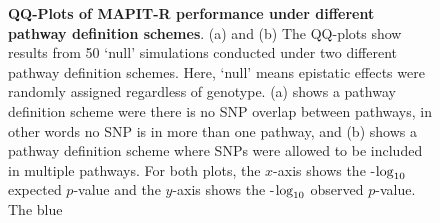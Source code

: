 \documentclass[10pt]{article}
\def\log{{\rm log}}
\begin{document}
\begin{figure}[htbp]
\centering
{}
\caption{\textbf{QQ-Plots of MAPIT-R performance under different pathway definition schemes}. (a) and (b) The QQ-plots show results from 50 `null' simulations conducted under two different pathway definition schemes. Here, `null' means epistatic effects were randomly assigned regardless of genotype. (a) shows a pathway definition scheme were there is no SNP overlap between pathways, in other words no SNP is in more than one pathway, and (b) shows a pathway definition scheme where SNPs were allowed to be included in multiple pathways. For both plots, the $x$-axis shows the -$\log_{10}$ expected $p$-value and the $y$-axis shows the -$\log_{10}$ observed $p$-value. The blue 
}
\label{InterPath-Supp-Figure-Greg-Simulations-part2}
\end{figure}
\clearpage
\end{document}
